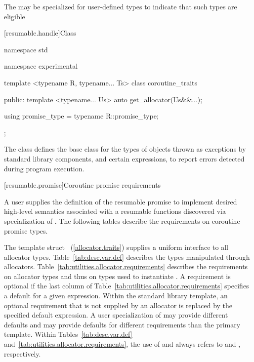 \pnum
The  may be specialized for user-defined types 
to indicate that such types are eligible


[resumable.handle]{Class }

%
\begin{codeblock}
namespace std {
namespace experimental {
  template <typename R, typename... Ts>
  class coroutine_traits {
  public:
    template <typename... Us>
    auto get_allocator(Us&&...);
				
    using promise_type = typename R::promise_type;
  };
}
}
\end{codeblock}

\pnum
The class
defines the base
class for the types of objects thrown as exceptions by
\Cpp standard library components, and certain
expressions, to report errors detected during program execution.

[resumable.promise]{Coroutine promise requirements}

\pnum
A user supplies the definition of the resumable promise to implement 
desired high-level semantics associated with a resumable functions
discovered via specialization of .
The following tables describe the requirements on
coroutine promise types.

\pnum
The template struct ~(\ref{allocator.traits}) supplies
a uniform interface to all allocator types.
Table~\ref{tab:desc.var.def} describes the types manipulated
through allocators. Table~\ref{tab:utilities.allocator.requirements}
describes the requirements on allocator types
and thus on types used to instantiate . A requirement
is optional if the last column of
Table~\ref{tab:utilities.allocator.requirements} specifies a default for a
given expression. Within the standard library 
template, an optional requirement that is not supplied by an allocator is
replaced by the specified default expression. A user specialization of
 may provide different defaults and may provide
defaults for different requirements than the primary template. Within
Tables~\ref{tab:desc.var.def} and~\ref{tab:utilities.allocator.requirements},
the use of  and  always refers to 
and , respectively.

